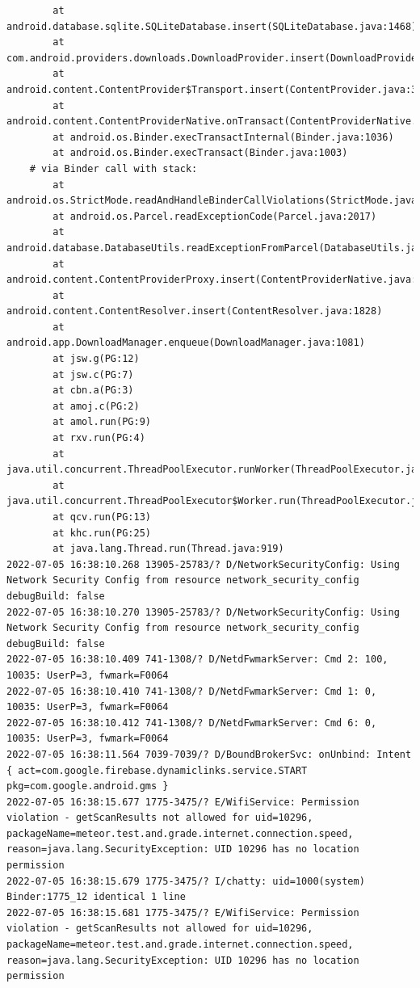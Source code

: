 \documentclass[a4paper,12pt]{book}
\begin{document}
\begin{lstlisting}
        at android.database.sqlite.SQLiteDatabase.insert(SQLiteDatabase.java:1468)
        at com.android.providers.downloads.DownloadProvider.insert(DownloadProvider.java:972)
        at android.content.ContentProvider$Transport.insert(ContentProvider.java:309)
        at android.content.ContentProviderNative.onTransact(ContentProviderNative.java:154)
        at android.os.Binder.execTransactInternal(Binder.java:1036)
        at android.os.Binder.execTransact(Binder.java:1003)
    # via Binder call with stack:
        at android.os.StrictMode.readAndHandleBinderCallViolations(StrictMode.java:2289)
        at android.os.Parcel.readExceptionCode(Parcel.java:2017)
        at android.database.DatabaseUtils.readExceptionFromParcel(DatabaseUtils.java:137)
        at android.content.ContentProviderProxy.insert(ContentProviderNative.java:481)
        at android.content.ContentResolver.insert(ContentResolver.java:1828)
        at android.app.DownloadManager.enqueue(DownloadManager.java:1081)
        at jsw.g(PG:12)
        at jsw.c(PG:7)
        at cbn.a(PG:3)
        at amoj.c(PG:2)
        at amol.run(PG:9)
        at rxv.run(PG:4)
        at java.util.concurrent.ThreadPoolExecutor.runWorker(ThreadPoolExecutor.java:1167)
        at java.util.concurrent.ThreadPoolExecutor$Worker.run(ThreadPoolExecutor.java:641)
        at qcv.run(PG:13)
        at khc.run(PG:25)
        at java.lang.Thread.run(Thread.java:919)
2022-07-05 16:38:10.268 13905-25783/? D/NetworkSecurityConfig: Using Network Security Config from resource network_security_config debugBuild: false
2022-07-05 16:38:10.270 13905-25783/? D/NetworkSecurityConfig: Using Network Security Config from resource network_security_config debugBuild: false
2022-07-05 16:38:10.409 741-1308/? D/NetdFwmarkServer: Cmd 2: 100, 10035: UserP=3, fwmark=F0064
2022-07-05 16:38:10.410 741-1308/? D/NetdFwmarkServer: Cmd 1: 0, 10035: UserP=3, fwmark=F0064
2022-07-05 16:38:10.412 741-1308/? D/NetdFwmarkServer: Cmd 6: 0, 10035: UserP=3, fwmark=F0064
2022-07-05 16:38:11.564 7039-7039/? D/BoundBrokerSvc: onUnbind: Intent { act=com.google.firebase.dynamiclinks.service.START pkg=com.google.android.gms }
2022-07-05 16:38:15.677 1775-3475/? E/WifiService: Permission violation - getScanResults not allowed for uid=10296, packageName=meteor.test.and.grade.internet.connection.speed, reason=java.lang.SecurityException: UID 10296 has no location permission
2022-07-05 16:38:15.679 1775-3475/? I/chatty: uid=1000(system) Binder:1775_12 identical 1 line
2022-07-05 16:38:15.681 1775-3475/? E/WifiService: Permission violation - getScanResults not allowed for uid=10296, packageName=meteor.test.and.grade.internet.connection.speed, reason=java.lang.SecurityException: UID 10296 has no location permission

\end{lstlisting}
\end{document}
